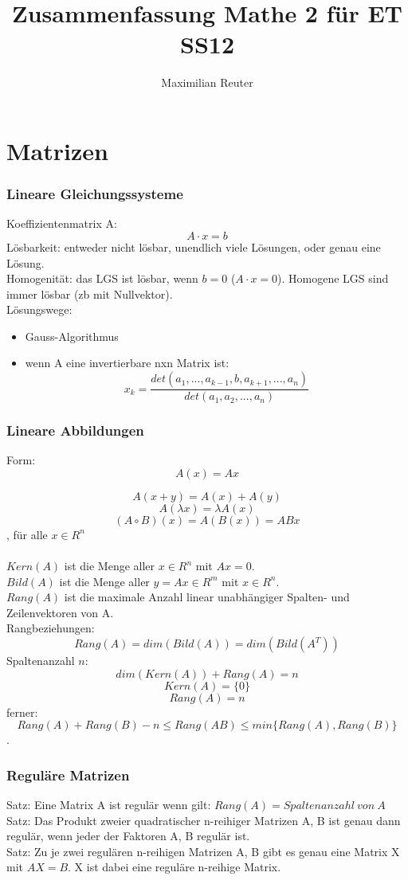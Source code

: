\documentclass[12pt,a4paper]{article}
\author{Maximilian Reuter}
\title{Zusammenfassung Mathe 2 für ET SS12}
\begin{document}
\maketitle
\tableofcontents
\newpage

\part{Matrizen}
\section{Lineare Gleichungssysteme}
Koeffizientenmatrix A:
\[A \cdot x = b\]
Lösbarkeit: entweder nicht lösbar, unendlich viele Lösungen, oder genau eine Lösung.\\
Homogenität: das LGS ist lösbar, wenn $b = 0$ ($A \cdot x = 0$). Homogene LGS sind immer lösbar (zb mit Nullvektor).\\
Lösungswege:\\
\begin{itemize}
\item Gauss-Algorithmus
\item wenn A eine invertierbare nxn Matrix ist: \[x_k = \frac{det(a_1, ...,a_{k-1},b,a_{k+1},...,a_n)}{det(a_1,a_2,...,a_n)}\]
\end{itemize}

\section{Lineare Abbildungen}
Form: 
\[A(x) = Ax \]

\[A(x+y) = A(x) + A(y)\]
\[A(\lambda x) = \lambda A(x)\]
\[(A \circ B) (x) = A(B(x))=ABx\]
, für alle $x \in R^n$\\\\
$Kern(A)$ ist die Menge aller $x \in R^n$ mit $Ax = 0$.\\
$Bild(A)$ ist die Menge aller $y = Ax \in R^m$ mit $x \in R^n$.\\
$Rang(A)$ ist die maximale Anzahl linear unabhängiger Spalten- und Zeilenvektoren von A.\\
Rangbeziehungen:
\[Rang(A) = dim(Bild(A)) = dim(Bild(A^T))\]
Spaltenanzahl $n$:
\[dim(Kern(A))+Rang(A) = n\]
\[Kern(A) = \{0\}\]
\[Rang(A) = n\]
ferner: \[Rang(A) + Rang(B) -n \leq Rang(AB) \leq min\{Rang(A), Rang(B)\}\].

\section{Reguläre Matrizen}
Satz: Eine Matrix A ist regulär wenn gilt: $Rang(A) = Spaltenanzahl\ von\ A$\\
Satz: Das Produkt zweier quadratischer n-reihiger Matrizen A, B ist genau dann regulär, wenn jeder der Faktoren A, B regulär ist.\\
Satz: Zu je zwei regulären n-reihigen Matrizen A, B gibt es genau eine Matrix X mit $AX = B$. X ist dabei eine reguläre n-reihige Matrix.\\
\end{document}
